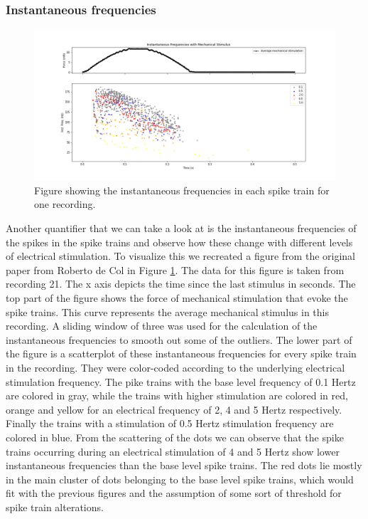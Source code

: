 \subsubsection{Instantaneous frequencies}
\begin{figure}
	\includegraphics[width = \textwidth]{src/pic/11_12_13U1b_inst_freqs}
	\caption{Figure showing the instantaneous frequencies in each spike train for one recording.}
	\label{fig:inst_freqs}
\end{figure}
Another quantifier that we can take a look at is the instantaneous frequencies of the spikes in the spike trains and observe how these change with different levels of electrical stimulation. To visualize this we recreated a figure from the original paper from Roberto de Col in Figure \ref{fig:inst_freqs}. The data for this figure is taken from recording 21. The x axis depicts the time since the last stimulus in seconds. The top part of the figure shows the force of mechanical stimulation that evoke the spike trains. This curve represents the average mechanical stimulus in this recording. A sliding window of three was used for the calculation of the instantaneous frequencies to smooth out some of the outliers. The lower part of the figure is a scatterplot of these instantaneous frequencies for every spike train in the recording. They were color-coded according to the underlying electrical stimulation frequency. The pike trains with the base level frequency of 0.1 Hertz are colored in gray, while the trains with higher stimulation are colored in red, orange and yellow for an electrical frequency of 2, 4 and 5 Hertz respectively. Finally the trains with a stimulation of 0.5 Hertz stimulation frequency are colored in blue. From the scattering of the dots we can observe that the spike trains occurring during an electrical stimulation of 4 and 5 Hertz show lower instantaneous frequencies than the base level spike trains. The red dots lie mostly in the main cluster of dots belonging to the base level spike trains, which would fit with the previous figures and the assumption of some sort of threshold for spike train alterations.







\cleardoublepage
